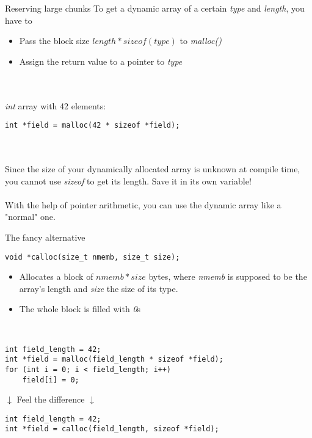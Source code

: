 \begin{frame}[fragile]{Reserving large chunks}
	To get a dynamic array of a certain \textit{type} and \textit{length}, you have to
	\begin{itemize}
		\item Pass the block size $length * sizeof(type)$ to \textit{malloc()}
		\item Assign the return value to a pointer to \textit{type}
	\end{itemize}\ \\
	\ \\
	\textit{int} array with 42 elements:
	\begin{lstlisting}[numbers=none]
int *field = malloc(42 * sizeof *field);
\end{lstlisting}\ \\
	\ \\
	Since the size of your dynamically allocated array is unknown at compile time, you cannot use \textit{sizeof} to get its length. Save it in its own variable!\\
	\ \\
	With the help of pointer arithmetic, you can use the dynamic array like a "normal" one.
\end{frame}


\begin{frame}[fragile]{The fancy alternative}
		\begin{lstlisting}[numbers=none]
void *calloc(size_t nmemb, size_t size);
\end{lstlisting}
	\begin{itemize}
		\item Allocates a block of $nmemb * size$ bytes, where \textit{nmemb} is supposed to be the array's length and \textit{size} the size of its type.
		\item The whole block is filled with \textit{0}s
	\end{itemize}
	\ \\
	\begin{lstlisting}[numbers=none]
int field_length = 42;
int *field = malloc(field_length * sizeof *field);
for (int i = 0; i < field_length; i++)
	field[i] = 0;
\end{lstlisting}
	\center	$\downarrow$ Feel the difference $\downarrow$
	\begin{lstlisting}[numbers=none]
int field_length = 42;
int *field = calloc(field_length, sizeof *field);
\end{lstlisting}
\end{frame}

